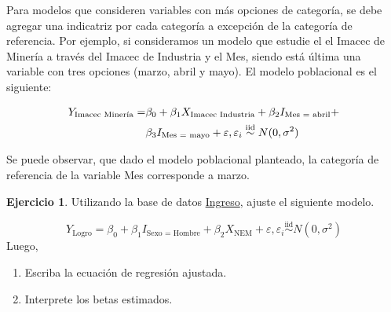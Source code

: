 \documentclass[
  11pt,
]{book}
\providecommand{\tightlist}{%
  \setlength{\itemsep}{0pt}\setlength{\parskip}{0pt}}
\theoremstyle{definition}
\theoremstyle{definition}
\theoremstyle{definition}
\newtheorem{exercise}{Ejercicio}[chapter]
\theoremstyle{definition}
\theoremstyle{remark}
\begin{document}
Para modelos que consideren variables con más opciones de categoría, se debe agregar una indicatriz por cada categoría a excepción de la categoría de referencia. Por ejemplo, si consideramos un modelo que estudie el el Imacec de Minería a través del Imacec de Industria y el Mes, siendo está última una variable con tres opciones (marzo, abril y mayo). El modelo poblacional es el siguiente:

\begin{equation}
\notag
\begin{split}
Y_{\text{Imacec Minería}} = &\beta_0 + \beta_1X_{\text{Imacec Industria}} + \beta_2I_{\text{Mes = abril}} + \\
&\beta_3I_{\text{Mes = mayo}} + \varepsilon, \varepsilon_i \overset{\text{iid}}{\sim} N(0,\sigma^2)\\
\end{split}
\end{equation}

Se puede observar, que dado el modelo poblacional planteado, la categoría de referencia de la variable Mes corresponde a marzo.

\begin{exercise}

Utilizando la base de datos \hyperref[Ingreso]{Ingreso}, ajuste el siguiente modelo.

\[
Y_{\text{Logro}} = \beta_0 + \beta_1I_{\text{Sexo = Hombre}} + \beta_2X_{\text{NEM}} + \varepsilon, \varepsilon_i \overset{\text{iid}}{\sim} N(0,\sigma^2)
\]
Luego,

\begin{enumerate}
\def\labelenumi{\arabic{enumi}.}
\tightlist
\item
  Escriba la ecuación de regresión ajustada.
\item
  Interprete los betas estimados.
\end{enumerate}

\end{exercise}
\end{document}
